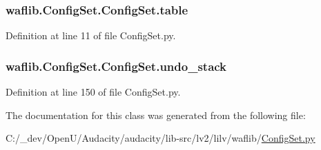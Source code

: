 \subsubsection[{\texorpdfstring{table}{table}}]{\setlength{\rightskip}{0pt plus 5cm}waflib.\+Config\+Set.\+Config\+Set.\+table}\hypertarget{classwaflib_1_1_config_set_1_1_config_set_a80c48ea963cc949456ea52c8c6d968c9}{}\label{classwaflib_1_1_config_set_1_1_config_set_a80c48ea963cc949456ea52c8c6d968c9}


Definition at line 11 of file Config\+Set.\+py.

\subsubsection[{\texorpdfstring{undo\+\_\+stack}{undo_stack}}]{\setlength{\rightskip}{0pt plus 5cm}waflib.\+Config\+Set.\+Config\+Set.\+undo\+\_\+stack}\hypertarget{classwaflib_1_1_config_set_1_1_config_set_a55c2c25b13aa6ee4bccebe58af4aadc0}{}\label{classwaflib_1_1_config_set_1_1_config_set_a55c2c25b13aa6ee4bccebe58af4aadc0}


Definition at line 150 of file Config\+Set.\+py.



The documentation for this class was generated from the following file\+:\begin{DoxyCompactItemize}
\item 
C\+:/\+\_\+dev/\+Open\+U/\+Audacity/audacity/lib-\/src/lv2/lilv/waflib/\hyperlink{lilv_2waflib_2_config_set_8py}{Config\+Set.\+py}\end{DoxyCompactItemize}
